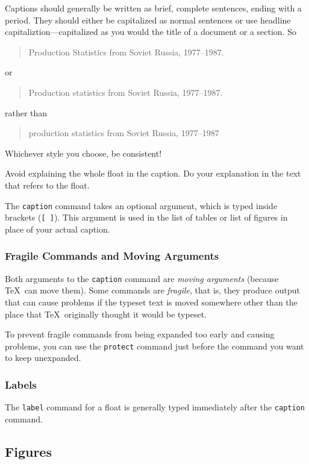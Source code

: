 \documentclass{icmmcm}
\newcommand{\bslash}{\symbol{'134}}%
\newcommand{\bsl}{{\texttt{\bslash}}}
\newcommand{\com}[1]{\bsl\texttt{#1}\xspace}
\begin{document}
{Captions should generally be written as brief, complete sentences,
ending with a period.  They should either be capitalized as normal
sentences or use headline capitaliztion---capitalized as you would the
title of a document or a section.  So
\begin{quote}
  Production Statistics from Soviet Russia, 1977--1987.
\end{quote}
or
\begin{quote}
  Production statistics from Soviet Russia, 1977--1987.
\end{quote}
rather than
\begin{quote}
  production statistics from Soviet Russia, 1977--1987
\end{quote}
Whichever style you choose, be consistent!

Avoid explaining the whole float in the caption.  Do your explanation
in the text that refers to the float.  

The \com{caption} command takes an optional argument, which is typed
inside brackets (\verb|[ ]|).  This argument is used in the list of
tables or list of figures in place of your actual caption.


\subsubsection{Fragile Commands and Moving Arguments}%
\label{sec:fragile-commands}

Both arguments to the \com{caption} command are \emph{moving
  arguments} (because \TeX\ can move them).  Some commands are
\emph{fragile}, that is, they produce output that can cause problems
if the typeset text is moved somewhere other than the place that \TeX\ 
originally thought it would be typeset.
  
  To prevent fragile commands from being expanded too early and
  causing problems, you can use the \com{protect} command just before
  the command you want to keep unexpanded.


\subsubsection{Labels}%
\label{sec:labeling-floats}

The \com{label} command for a float is generally typed immediately
after the \com{caption} command.


\subsection{Figures}
\label{sec:including-graphics}

}
\end{document}
